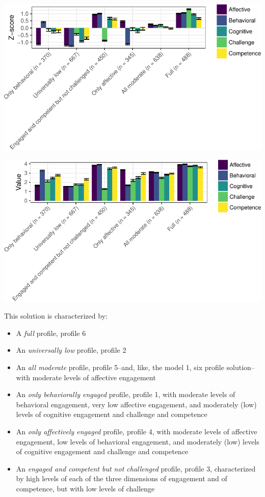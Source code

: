 \documentclass[]{msu-thesis}
\providecommand{\tightlist}{%
  \setlength{\itemsep}{0pt}\setlength{\parskip}{0pt}}
\theoremstyle{definition}
\theoremstyle{definition}
\theoremstyle{definition}
\theoremstyle{remark}
\begin{document}
\begin{center}\includegraphics[width=0.8\linewidth]{rosenberg-dissertation_files/figure-latex/unnamed-chunk-10-1} \end{center}

\begin{center}\includegraphics[width=0.8\linewidth]{rosenberg-dissertation_files/figure-latex/unnamed-chunk-10-2} \end{center}

This solution is characterized by:

\begin{itemize}
\tightlist
\item
  A \emph{full} profile, profile 6
\item
  An \emph{universally low} profile, profile 2
\item
  An \emph{all moderate} profile, profile 5--and, like, the model 1, six
  profile solution--with moderate levels of affective engagement
\item
  An \emph{only behaviorally engaged} profile, profile 1, with moderate
  levels of behavioral engagement, very low affective engagement, and
  moderately (low) levels of cognitive engagement and challenge and
  competence
\item
  An \emph{only affectively engaged} profile, profile 4, with moderate
  levels of affective engagement, low levels of behavioral engagement,
  and moderately (low) levels of cognitive engagement and challenge and
  competence
\item
  An \emph{engaged and competent but not challenged} profile, profile 3,
  characterized by high levels of each of the three dimensions of
  engagement and of competence, but with low levels of challenge
\end{itemize}
\end{document}
